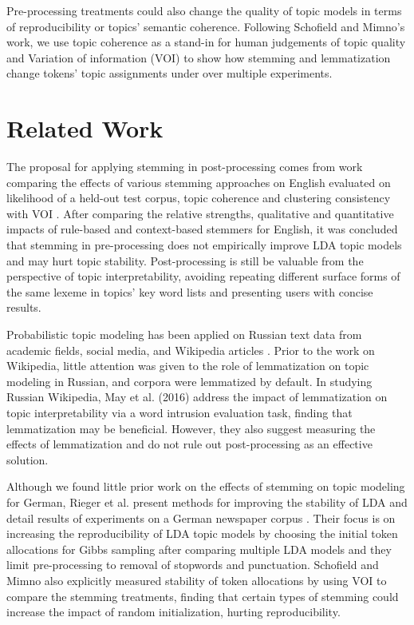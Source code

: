 \documentclass[11pt,a4paper]{article}
\begin{document}
Pre-processing treatments could also change the quality of topic models in terms of reproducibility or topics' semantic coherence. Following Schofield and Mimno's work, we use topic coherence as a stand-in for human judgements of topic quality \cite{mimno2011optimizing} and Variation of information (VOI) \cite{Meila2003ComparingCB} to show how stemming and lemmatization change tokens' topic assignments under over multiple experiments.


\section{Related Work}
The proposal for applying stemming in post-processing comes from work comparing the effects of various stemming approaches on English evaluated on likelihood of a held-out test corpus, topic coherence and clustering consistency with VOI \cite{schofield-mimno-2016-comparing}. After comparing the relative strengths, qualitative and quantitative impacts of rule-based and context-based stemmers for English, it was concluded that stemming in pre-processing does not empirically improve LDA topic models and may hurt topic stability. Post-processing is still be valuable from the perspective of topic interpretability, avoiding repeating different surface forms of the same lexeme in topics' key word lists and presenting users with concise results.

Probabilistic topic modeling has been applied on Russian text data from academic fields, social media, and Wikipedia articles \cite{mitrofanova2015probabilistic,koltsova2013,May2016AnAO}. Prior to the work on Wikipedia, little attention was given to the role of lemmatization on topic modeling in Russian, and corpora were lemmatized by default. In studying Russian Wikipedia, May et al. (2016) address the impact of lemmatization on topic interpretability via a word intrusion evaluation task, finding that lemmatization may be beneficial. However, they also suggest measuring the effects of lemmatization and do not rule out post-processing as an effective solution.

Although we found little prior work on the effects of stemming on topic modeling for German, Rieger et al. present methods for improving the stability of LDA and detail results of experiments on a German newspaper corpus \cite{Rieger2020ImprovingLD}. Their focus is on increasing the reproducibility of LDA topic models by choosing the initial token allocations for Gibbs sampling after comparing multiple LDA models and they limit pre-processing to removal of stopwords and punctuation. Schofield and Mimno also explicitly measured stability of token allocations by using VOI to compare the stemming treatments, finding that certain types of stemming could increase the impact of random initialization, hurting reproducibility.
\end{document}
